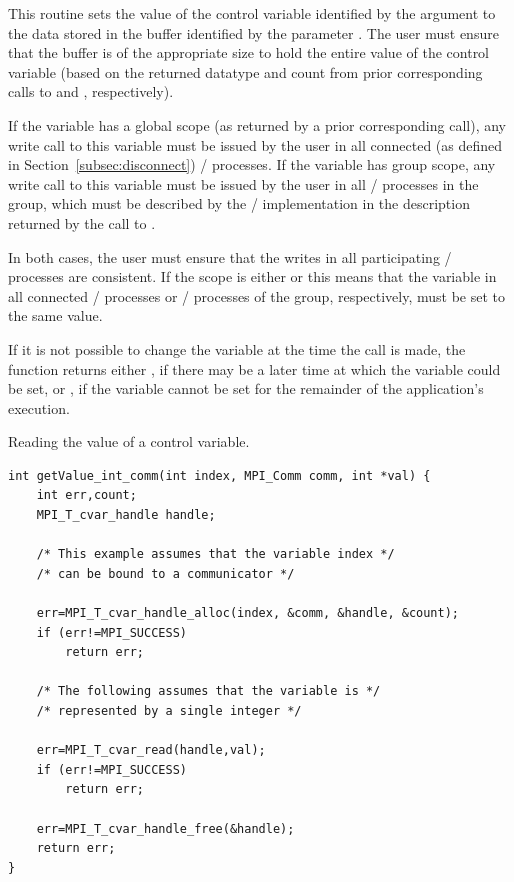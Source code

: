 This routine sets the value of the control variable identified by the
argument  to the data stored in the buffer identified by the
parameter .  The user must ensure that the buffer is of the
appropriate size to hold the entire value of the control variable (based on
the returned datatype and count from prior corresponding calls to
 and
, respectively).

If the variable has a global scope (as returned by a prior corresponding
 call), any write call to this variable
must be issued by the user in all connected (as defined in
Section~\ref{subsec:disconnect}) \MPI/ processes.  If the variable has
group scope, any write call to this variable must be issued by the user in
all \MPI/ processes in the group, which must be described by the \MPI/
implementation in the description returned by the call to .

In both cases, the user must ensure that the writes in all participating \MPI/ processes are
consistent.  If the scope is either  or
 this means that the variable in all
connected \MPI/ processes or \MPI/ processes of the group, respectively, must be set to the same value.

If it is not possible to change the variable at the time the call is made,
the function returns either , if
there may be a later time at which the variable could be set, or
, if the variable cannot be set for
the remainder of the application's execution.

\begin{example}
%
%
Reading the value of a control variable.

\begin{lstlisting}[language={[MPI]C}]
int getValue_int_comm(int index, MPI_Comm comm, int *val) {
    int err,count;
    MPI_T_cvar_handle handle;

    /* This example assumes that the variable index */
    /* can be bound to a communicator */

    err=MPI_T_cvar_handle_alloc(index, &comm, &handle, &count);
    if (err!=MPI_SUCCESS)
        return err;

    /* The following assumes that the variable is */
    /* represented by a single integer */

    err=MPI_T_cvar_read(handle,val);
    if (err!=MPI_SUCCESS)
        return err;

    err=MPI_T_cvar_handle_free(&handle);
    return err;
}
\end{lstlisting}
\end{example}


